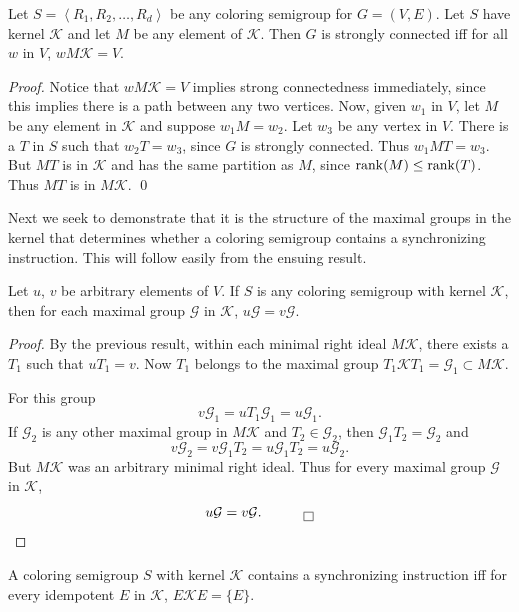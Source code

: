 \begin{theorem}		\label{thm:4.4}
Let $S=\left\langle R_1,R_2,\dots,R_d \right\rangle$ be any coloring
semigroup for $G=(V,E)$. Let $S$ have kernel $\mathcal{K}$ and let $M$ 
be any element of $\mathcal{K}$. 
Then $G$ is strongly connected iff for all $w$ in $V$, $wM\mathcal{K} = V$.
\end{theorem}

\begin{proof}
Notice that $wM\mathcal{K} = V$ implies strong connectedness immediately, since this implies there is a path between any two vertices. 
Now, given $w_1$ in $V$, let $M$ be any element in $\mathcal{K}$ and suppose
$w_1M=w_2$. 
Let $w_3$ be any vertex in $V$. 
There is a $T$ in $S$ such that $w_2T=w_3$, since $G$ is strongly connected. 
Thus $w_1MT=w_3$. 
But $MT$ is in $\mathcal{K}$ and has the same partition as $M$, since $\operatorname{rank}(M)\leq\operatorname{rank} (T)$. 
Thus $MT$ is in $M\mathcal{K}$.
\qed
\end{proof}

Next we seek to demonstrate that it is the structure of the maximal groups
in the kernel that determines whether a coloring semigroup contains a synchronizing instruction. 
This will follow easily from the ensuing result.

\begin{theorem}		\label{thm:4.5}
Let $u$, $v$ be arbitrary elements of $V$. 
If $S$ is any coloring semigroup with kernel $\mathcal{K}$, then for each maximal group $\mathcal{G}$ in $\mathcal{K}$, $u\mathcal{G} = v\mathcal{G}$.
\end{theorem}

\begin{proof}
By the previous result, within each minimal right ideal $M\mathcal{K}$, there exists a $T_1$ such that $uT_1=v$. 
Now $T_1$ belongs to the maximal group $T_1\mathcal{K}T_1 = \mathcal{G}_1\subset M\mathcal{K}$.

For this group
\[
  v\mathcal{G}_1 = uT_1\mathcal{G}_1= u\mathcal{G}_1.
\]
If $\mathcal{G}_2$ is any other maximal group in $M\mathcal{K}$ and $T_2 \in \mathcal{G}_2$, then $\mathcal{G}_1T_2 = \mathcal{G}_2$ and 
\[
  v\mathcal{G}_2 = v\mathcal{G}_1T_2 = u\mathcal{G}_1T_2 = u\mathcal{G}_2.
\]
But $M\mathcal{K}$ was an arbitrary minimal right ideal. 
Thus for every maximal group $\mathcal{G}$ in $\mathcal{K}$,
\[
  u\mathcal{G} = v\mathcal{G}. \quad \qed
\]
\end{proof}

\begin{theorem}		\label{thm:4.6}
A coloring semigroup $S$ with kernel $\mathcal{K}$ contains a synchronizing
instruction iff for every idempotent $E$ in 
$\mathcal{K}$, $E\mathcal{K}E = \{E\}$.
\end{theorem}

